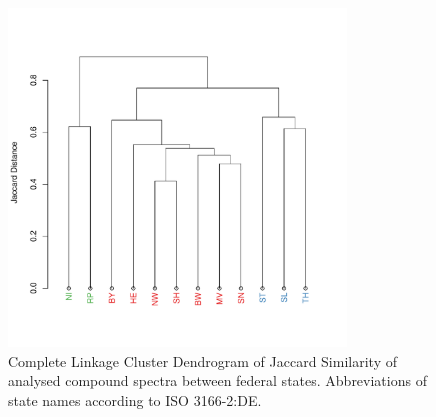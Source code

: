 \documentclass[pdftex,a4paper]{scrreprt}
\begin{document}
\begin{figure}[h]
	\centering
	\includegraphics[width = 0.8\textwidth]{varclus}
	\caption[Complete Linkage Cluster Dendrogram of Jaccard Similarity of analysed compound spectra between federal states.]{Complete Linkage Cluster Dendrogram of Jaccard Similarity of analysed compound spectra between federal states. Abbreviations of state names according to ISO 3166-2:DE.}
	\label{fig:varclus}
\end{figure}


\end{document}
